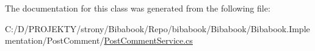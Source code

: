 The documentation for this class was generated from the following file\+:\begin{DoxyCompactItemize}
\item 
C\+:/\+D/\+P\+R\+O\+J\+E\+K\+T\+Y/strony/\+Bibabook/\+Repo/bibabook/\+Bibabook/\+Bibabook.\+Implementation/\+Post\+Comment/\hyperlink{_post_comment_service_8cs}{Post\+Comment\+Service.\+cs}\end{DoxyCompactItemize}
